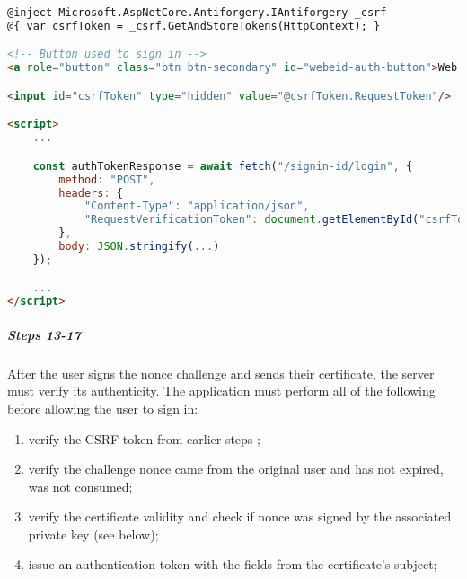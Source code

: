 \begin{lstlisting}[caption={Web eID UI excerpt}, label={lst:web-eid-challenge-ui}, language={html}]
@inject Microsoft.AspNetCore.Antiforgery.IAntiforgery _csrf
@{ var csrfToken = _csrf.GetAndStoreTokens(HttpContext); }

<!-- Button used to sign in -->
<a role="button" class="btn btn-secondary" id="webeid-auth-button">Web eID</a>

<input id="csrfToken" type="hidden" value="@csrfToken.RequestToken"/>

<script>
    ...

    const authTokenResponse = await fetch("/signin-id/login", {
        method: "POST",
        headers: {
            "Content-Type": "application/json",
            "RequestVerificationToken": document.getElementById("csrfToken").value
        },
        body: JSON.stringify(...)
    });

    ...
</script>
\end{lstlisting}

\subparagraph{Steps 13-17}

After the user signs the nonce challenge and sends their certificate, the server must verify its authenticity. The application must perform all of the following before allowing the user to sign in:

\begin{enumerate}
  \item verify the CSRF token from earlier steps \cite{ria-webeid-source-web-eid-authtoken-validation-java-readme};
  \item verify the challenge nonce came from the original user and has not expired, was not consumed;
  \item verify the certificate validity and check if nonce was signed by the associated private key (see below);
  \item issue an authentication token with the fields from the certificate's subject;
\end{enumerate}

